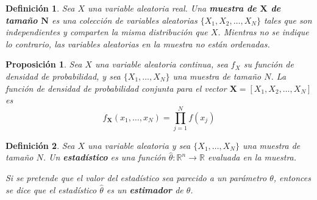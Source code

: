 \documentclass[12pt,letterpaper]{book}
\newtheorem{definicion}{Definición}[chapter]
\newtheorem{proposicion}[teorema]{Proposición}
\newcommand{\R}{\mathbb{R}}
\begin{document}
\begin{definicion}
Sea $X$ una variable aleatoria real. Una \textbf{muestra de $\boldsymbol{X}$ de tamaño $\boldsymbol{N}$} es una colección de variables aleatorias $\{ X_1, X_2, \dots, X_N \}$ tales que son independientes y comparten la misma distribución que $X$.
%
Mientras no se indique lo contrario, las variables aleatorias en la muestra no están ordenadas.
\end{definicion}

\begin{proposicion}
Sea $X$ una variable aleatoria continua, sea $f_X$ su función de densidad de probabilidad, y sea $\{ X_1, \dots, X_N \}$ una muestra de tamaño $N$. 
%
La función de densidad de probabilidad conjunta para el vector $\boldsymbol{X}=[ X_1, X_2, \dots, X_N ]$ es
\begin{equation}
f_{\boldsymbol{X}}(x_1, \dots, x_N ) = \prod_{j=1}^{N} f(x_j)
\end{equation}
\label{oculto1}
\end{proposicion}

\begin{definicion}
Sea $X$ una variable aleatoria y sea $\{ X_1, \dots, X_N \}$ una muestra de tamaño $N$.
%
Un \textbf{estadístico} es una función $\widehat{\theta}: \R^{n}\rightarrow\R$ evaluada en la muestra.

Si se pretende que el valor del estadístico sea \textit{parecido} a un parámetro $\theta$, entonces se dice que el estadístico $\widehat{\theta}$ es un \textbf{estimador} de $\theta$.
\end{definicion}


\end{document}
